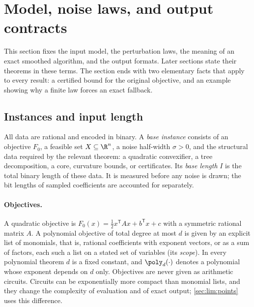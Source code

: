 \section{Model, noise laws, and output contracts}\label{sec:model}

This section fixes the input model, the perturbation laws, the meaning of
an exact smoothed algorithm, and the output formats. Later sections state
their theorems in these terms. The section ends with two elementary facts
that apply to every result: a certified bound for the original objective,
and an example showing why a finite law forces an exact fallback.

\subsection{Instances and input length}\label{sec:model:input}

All data are rational and encoded in binary. A \emph{base instance}
consists of an objective $F_0$, a feasible set $X\subseteq\R^n$, a noise
half-width $\sigma>0$, and the structural data required by the relevant
theorem: a quadratic convexifier, a tree decomposition, a core, curvature
bounds, or certificates. Its \emph{base length} $I$ is the total binary
length of these data. It is measured before any noise is drawn; the bit
lengths of sampled coefficients are accounted for separately.

\paragraph{Objectives.}
A quadratic objective is $F_0(x)=\frac12x^{\mathsf T}Ax+b^{\mathsf T}x+c$
with a symmetric rational matrix $A$. A polynomial objective of total degree
at most $d$ is given by an explicit list of monomials, that is, rational
coefficients with exponent vectors, or as a sum of factors, each such a list
on a stated set of variables (its \emph{scope}). In every polynomial theorem
$d$ is a fixed constant, and $\poly_d(\cdot)$ denotes a polynomial whose
exponent depends on $d$ only. Objectives are never given as arithmetic
circuits. Circuits can be exponentially more compact than monomial lists,
and they change the complexity of evaluation and of exact output;
\cref{sec:lim:points} uses this difference.

